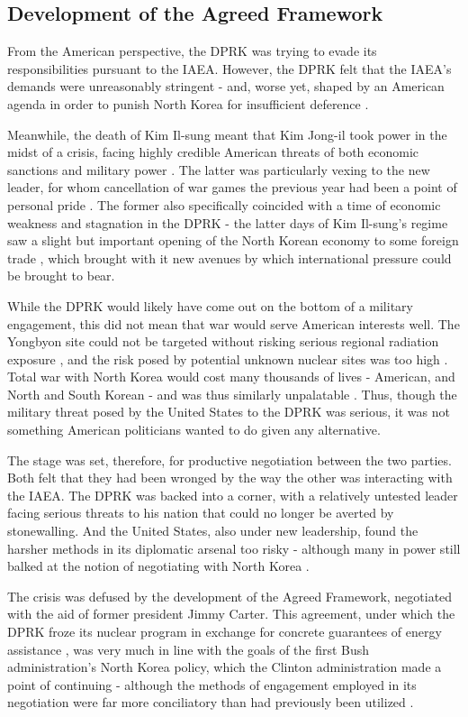 \subsection{Development of the Agreed Framework}

From the American perspective, the DPRK was trying to evade its responsibilities pursuant to the IAEA. However, the DPRK felt that the IAEA's demands were unreasonably stringent - and, worse yet, shaped by an American agenda in order to punish North Korea for insufficient deference \cite{cumings}.

Meanwhile, the death of Kim Il-sung meant that Kim Jong-il took power in the midst of a crisis, facing highly credible American threats of both economic sanctions and military power \cite{cerami}. The latter was particularly vexing to the new leader, for whom cancellation of war games the previous year had been a point of personal pride \cite{farrell}. The former also specifically coincided with a time of economic weakness and stagnation in the DPRK - the latter days of Kim Il-sung's regime saw a slight but important opening of the North Korean economy to some foreign trade \cite{sigal}, which brought with it new avenues by which international pressure could be brought to bear.

While the DPRK would likely have come out on the bottom of a military engagement, this did not mean that war would serve American interests well. The Yongbyon site could not be targeted without risking serious regional radiation exposure \cite{beal}, and the risk posed by potential unknown nuclear sites was too high \cite{sigal}. Total war with North Korea would cost many thousands of lives - American, and North and South Korean - and was thus similarly unpalatable \cite{cumings}. Thus, though the military threat posed by the United States to the DPRK was serious, it was not something American politicians wanted to do given any alternative.
	
The stage was set, therefore, for productive negotiation between the two parties. Both felt that they had been wronged by the way the other was interacting with the IAEA. The DPRK was backed into a corner, with a relatively untested leader facing serious threats to his nation that could no longer be averted by stonewalling. And the United States, also under new leadership, found the harsher methods in its diplomatic arsenal too risky - although many in power still balked at the notion of negotiating with North Korea \cite{hecker2}.

The crisis was defused by the development of the Agreed Framework, negotiated with the aid of former president Jimmy Carter. This agreement, under which the DPRK froze its nuclear program in exchange for concrete guarantees of energy assistance \cite{agreed}, was very much in line with the goals of the first Bush administration's North Korea policy, which the Clinton administration made a point of continuing \cite{cerami} - although the methods of engagement employed in its negotiation were far more conciliatory than had previously been utilized \cite{sigal}.

